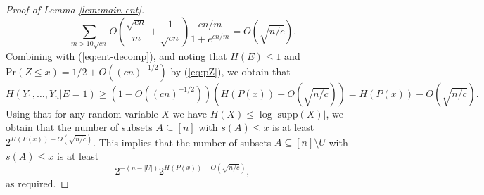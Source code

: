 \documentclass[10pt,a4paper]{amsart}
\newcommand{\pr}{\mathrm{Pr}}
\begin{document}
\begin{proof}[Proof of Lemma \ref{lem:main-ent}]
\[
    \sum_{m>10\sqrt{cn}} O\left(\frac{\sqrt{cn}}{m} + \frac{1}{\sqrt{cn}}\right) \frac{cn/m}{1+e^{cn/m}} = O(\sqrt{n/c}).
\]
Combining with (\ref{eq:ent-decomp}), and noting that $H(E)\le 1$ and $\pr(Z\le x) = 1/2 + O((cn)^{-1/2})$ by (\ref{eq:pZ}), we obtain that 
\[
    H(Y_1,\dots,Y_n|E=1) \ge (1-O((cn)^{-1/2}))(H(P(x)) - O(\sqrt{n/c})) = H(P(x)) - O(\sqrt{n/c}).
\]
Using that for any random variable $X$ we have $H(X)\le \log |\mathrm{supp}(X)|$, we obtain that the number of subsets $A\subseteq [n]$ with $s(A) \le x$ is at least $2^{H(P(x)) - O(\sqrt{n/c})}$. This implies that the number of subsets $A\subseteq [n]\setminus U$ with $s(A)\le x$ is at least 
\[
    2^{-(n-|U|)} 2^{H(P(x)) - O(\sqrt{n/c})},
\]
as required. 
\end{proof}
\end{document}
